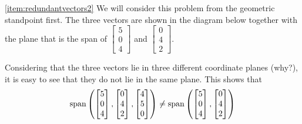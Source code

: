 \documentclass{ximera}
\begin{document}
\begin{example}
\begin{explanation}
\ref{item:redundantvectors2}
We will consider this problem from the geometric standpoint first.  The three vectors are shown in the diagram below together with the plane that is the span of $\begin{bmatrix}5\\0\\4\end{bmatrix}$ and $\begin{bmatrix}0\\4\\2\end{bmatrix}$.
\begin{image}
\end{image}
Considering that the three vectors lie in three different coordinate planes (why?), it is easy to see that they do not lie in the same plane.  This shows that 
$$\textnormal{span}\left(\begin{bmatrix}5\\0\\4\end{bmatrix}, \begin{bmatrix}0\\4\\2\end{bmatrix},\begin{bmatrix}4\\5\\0\end{bmatrix}\right)\neq\textnormal{span}\left(\begin{bmatrix}5\\0\\4\end{bmatrix}, \begin{bmatrix}0\\4\\2\end{bmatrix}\right)$$


\end{explanation}
\end{example}
\end{document}
